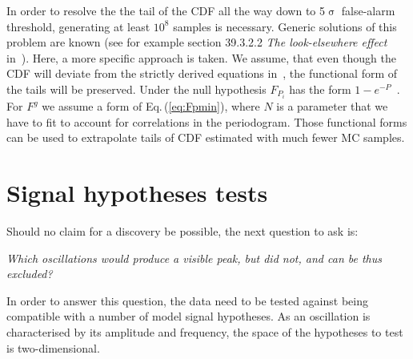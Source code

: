 In order to resolve the the tail of the CDF all the way down to 5$\upsigma$ false-alarm threshold, generating at least $10^8$ samples is necessary. Generic solutions of this problem are known (see for example section 39.3.2.2 \emph{The look-elsewhere effect} in~\cite{PDG2016}). Here, a more specific approach is taken. We assume, that even though the CDF will deviate from the strictly derived equations in~\cite{Scargle1982}, the functional form of the tails will be preserved. Under the null hypothesis $F_{P_i}$ has the form $1 - e^{-P}$~\cite{Scargle1982}. For $F^g$ we assume a form of Eq.\,(\ref{eq:Fpmin}), where $N$ is a parameter that we have to fit to account for correlations in the periodogram. Those functional forms can be used to extrapolate tails of CDF estimated with much fewer MC samples.


%





\section{Signal hypotheses tests}
\label{sec:signal_hypotheses_tests}
Should no claim for a discovery be possible, the next question to ask is:
\begin{center}
  \emph{Which oscillations would produce a visible peak, but did not, and can be thus excluded?}
\end{center}
In order to answer this question, the data need to be tested against being compatible with a number of model signal hypotheses. As an oscillation is characterised by its amplitude and frequency, the space of the hypotheses to test is two-dimensional.

